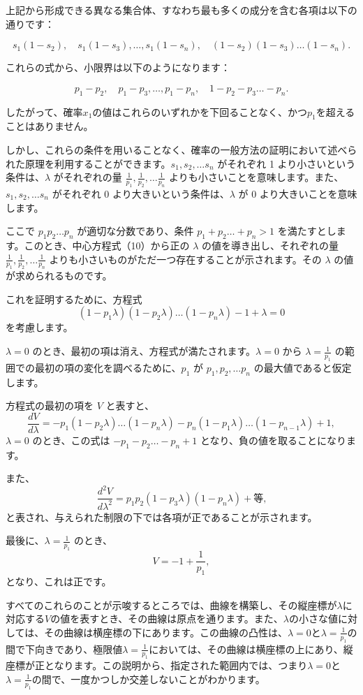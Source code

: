 \documentclass[a4paper,11pt,openany]{ltjsbook}
\begin{document}
上記から形成できる異なる集合体、すなわち最も多くの成分を含む各項は以下の通りです：

\[
  s_1(1-s_2),\quad s_1(1 - s_3), \dotsc, s_1(1 - s_n),\quad
  (1 - s_2)(1 - s_3) \dotsc (1 - s_n).
\]

これらの式から、小限界は以下のようになります：

\[
  p_1 - p_2,\quad p_1 - p_3, \dotsc, p_1 - p_n,\quad
  1 - p_2 - p_3 \dotsc - p_n.
\]

したがって、確率$x_1$の値はこれらのいずれかを下回ることなく、かつ$p_1$を超えることはありません。

しかし、これらの条件を用いることなく、確率の一般方法の証明において述べられた原理を利用することができます。$s_1, s_2, \dotsc s_n$ がそれぞれ 1 より小さいという条件は、$\lambda$ がそれぞれの量 $\frac{1}{p_1}, \frac{1}{p_2}, \dotsc \frac{1}{p_n}$ よりも小さいことを意味します。また、$s_1, s_2, \dotsc s_n$ がそれぞれ 0 より大きいという条件は、$\lambda$ が 0 より大きいことを意味します。

ここで $p_1 p_2 \dotsc p_n$ が適切な分数であり、条件 $p_1 + p_2 \dotsc + p_n > 1$ を満たすとします。このとき、中心方程式（10）から正の $\lambda$ の値を導き出し、それぞれの量 $\frac{1}{p_1}, \frac{1}{p_2}, \dotsc \frac{1}{p_n}$ よりも小さいものがただ一つ存在することが示されます。その $\lambda$ の値が求められるものです。

これを証明するために、方程式
\[
  (1 - p_1\lambda)(1 - p_2\lambda) \dotsc (1 - p_n\lambda)
  - 1 + \lambda = 0
\]
を考慮します。

$\lambda = 0$ のとき、最初の項は消え、方程式が満たされます。$\lambda = 0$ から $\lambda = \frac{1}{p_1}$ の範囲での最初の項の変化を調べるために、$p_1$ が $p_1, p_2, \dotsc p_n$ の最大値であると仮定します。

方程式の最初の項を $V$ と表すと、
\[
  \frac{dV}{d\lambda}
  = -p_1(1-p_2\lambda) \dotsc (1-p_n\lambda)
    - p_n(1-p_1\lambda) \dotsc (1-p_{n-1}\lambda) + 1,
\]
$\lambda = 0$ のとき、この式は $-p_1 - p_2 \dotsc - p_n + 1$ となり、負の値を取ることになります。

また、
\[
  \frac{d^2V}{d\lambda^2}
  = p_1p_2(1-p_3\lambda)(1-p_n\lambda) + \text{等,}
\]
と表され、与えられた制限の下では各項が正であることが示されます。

最後に、$\lambda = \frac{1}{p_1}$ のとき、
\[
  V = -1 + \frac{1}{p_1},
\]
となり、これは正です。

すべてのこれらのことが示唆するところでは、曲線を構築し、その縦座標が$\lambda$に対応する$V$の値を表すとき、その曲線は原点を通ります。また、$\lambda$の小さな値に対しては、その曲線は横座標の下にあります。この曲線の凸性は、$\lambda = 0$と$\lambda = \frac{1}{p_1}$の間で下向きであり、極限値$\lambda = \frac{1}{p_1}$においては、その曲線は横座標の上にあり、縦座標が正となります。この説明から、指定された範囲内では、つまり$\lambda = 0$と$\lambda = \frac{1}{p_1}$の間で、一度かつしか交差しないことがわかります。
\end{document}
